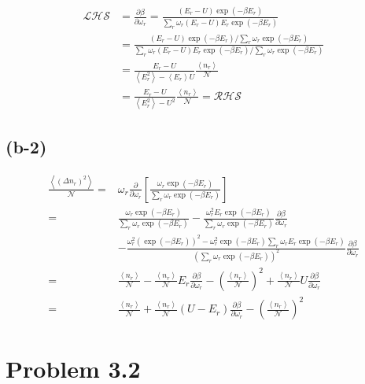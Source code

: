 \documentclass{article}
\begin{document}
    \begin{align}
    \mathcal{LHS}&=\frac{\partial\beta}{\partial\omega_r}
    = \frac{(E_r-U)\exp{(-\beta E_r)}} {\sum_r\omega_r (E_r-U) E_r \exp{(-\beta E_r)}}\\
    &= \frac{(E_r-U)\exp{(-\beta E_r)}  /  \sum_r\omega_r \exp{(-\beta E_r)}} {\sum_r\omega_r (E_r-U) E_r \exp{(-\beta E_r)}  /  \sum_r\omega_r \exp{(-\beta E_r)}}\\
    &= \frac{E_r-U} {\left< E_r^2 \right> -\left< E_r \right>U} \frac{\left< n_r \right>}{\mathcal{N}}\\
    &= \frac{E_r-U}{\left< E_r^2 \right> -U^2} \frac{\left< n_r \right>}{\mathcal{N}}=\mathcal{RHS}
    \end{align}

\subsection*{(b-2)}
    \begin{align}
    \frac{\left< (\Delta n_r)^2 \right>}{\mathcal{N}}
    =& \omega_r \frac{\partial}{\partial \omega_r}\left[ \frac{\omega_r \exp{(-\beta E_r)}}{ \sum_r \omega_r \exp{(-\beta E_r)} } \right]\\
    =& \frac{\omega_r \exp{(-\beta E_r)}}{ \sum_r \omega_r \exp{(-\beta E_r)} }
    -\frac{\omega_r^2 E_r  \exp{(-\beta E_r)}}{ \sum_r\omega_r \exp{(-\beta E_r)} }  \frac{\partial\beta}{\partial \omega_r}\\
    &-\frac{\omega_r^2 \left(\exp{(-\beta E_r)}\right)^2 - \omega_r^2 \exp{(-\beta E_r)} \sum_r\omega_r E_r \exp{(-\beta E_r)} }
    { \left( \sum_r\omega_r \exp{(-\beta E_r)} \right)^2 }
    \frac{\partial\beta}{\partial \omega_r}\\
    =&\frac{\left< n_r \right>}{\mathcal{N}}
    -\frac{\left< n_r \right>}{\mathcal{N}}E_r \frac{\partial\beta}{\partial \omega_r}
    - \left(  \frac{\left< n_r \right>}{\mathcal{N}} \right)^2
    +\frac{\left< n_r \right>}{\mathcal{N}} U \frac{\partial\beta}{\partial \omega_r}\\
    =&\frac{\left< n_r \right>}{\mathcal{N}}
    +\frac{\left< n_r \right>}{\mathcal{N}} (U-E_r) \frac{\partial\beta}{\partial \omega_r}
    - \left(  \frac{\left< n_r \right>}{\mathcal{N}} \right)^2
    \end{align}


\section*{Problem 3.2}
\end{document}
